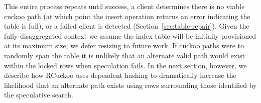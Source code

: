 This entire process repeats until success, a client determines there
is no viable cuckoo path (at which point the insert operation returns
an error indicating the table is full), or a failed client is detected
(Section~\ref{sec:table-repair}).  Given the fully-disaggregated
context we assume the index table will be initially provisioned at its
maximum size; we defer resizing to future work.
If cuckoo paths were to randomly span the table it is unlikely that an
alternate valid path would exist within the locked rows when
speculation fails.  In the next section, however, we describe how RCuckoo uses
dependent hashing to dramatically increase the likelihood that an
alternate path exists using rows surrounding those identified
by the speculative search.





